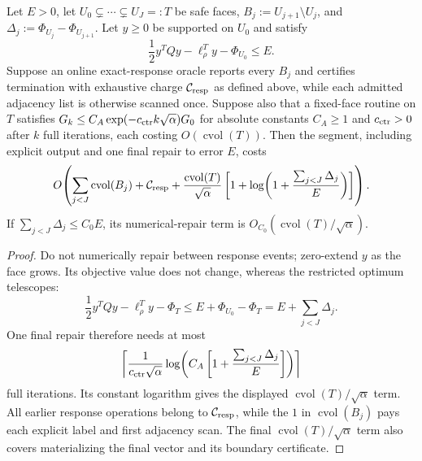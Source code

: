 \begin{theorem}
\label{thm:aggregate-repair-oracle}
Let $E>0$, let $U_0\subsetneq\cdots\subsetneq U_J=:T$ be safe faces,
$B_j:=U_{j+1}\setminus U_j$, and
$\Delta_j:=\Phi_{U_j}-\Phi_{U_{j+1}}$.  Let $y\geq0$ be supported on $U_0$
and satisfy
\begin{equation}
 \frac12y^TQy-\ell_\rho^Ty-\Phi_{U_0}\leq E.
 \label{eq:aggregate-initial-error}
\end{equation}
Suppose an online exact-response oracle reports every $B_j$ and certifies
termination with exhaustive charge $\mathcal C_{\rm resp}$ as defined above,
while each admitted adjacency list is otherwise scanned once.  Suppose also
that a fixed-face routine on $T$ satisfies
$G_k\leq C_A\exp(-c_{\rm ctr}k\sqrt\alpha)G_0$ for absolute constants
$C_A\geq1$ and $c_{\rm ctr}>0$ after $k$ full iterations, each costing
$O(\!\operatorname{cvol}(T))$.  Then the segment, including explicit output
and one final repair to error $E$, costs
\begin{equation}
 O\!\left(
  \sum_{j<J}\operatorname{cvol}(B_j)+\mathcal C_{\rm resp}
  +\frac{\operatorname{cvol}(T)}{\sqrt\alpha}\left[
    1+\log\!\left(1+\frac{\sum_{j<J}\Delta_j}{E}\right)
  \right]
 \right).
 \label{eq:aggregate-oracle-work}
\end{equation}
If $\sum_{j<J}\Delta_j\leq C_0E$, its numerical-repair term is
$O_{C_0}(\operatorname{cvol}(T)/\sqrt\alpha)$.
\end{theorem}

\begin{proof}
Do not numerically repair between response events; zero-extend $y$ as the face
grows.  Its objective value does not change, whereas the restricted optimum
telescopes:
\begin{equation}
 \frac12y^TQy-\ell_\rho^Ty-\Phi_T
 \leq E+\Phi_{U_0}-\Phi_T
 =E+\sum_{j<J}\Delta_j.
 \label{eq:aggregate-gap-telescope}
\end{equation}
One final repair therefore needs at most
\begin{equation}
 \left\lceil
  \frac1{c_{\rm ctr}\sqrt\alpha}
  \log\!\left(C_A\left[1+\frac{\sum_{j<J}\Delta_j}{E}\right]\right)
 \right\rceil
 \label{eq:aggregate-final-iterations}
\end{equation}
full iterations.  Its constant logarithm gives the displayed
$\operatorname{cvol}(T)/\sqrt\alpha$ term.  All earlier response operations
belong to $\mathcal C_{\rm resp}$, while the $1$ in
$\operatorname{cvol}(B_j)$ pays each explicit label and first adjacency
scan.  The final $\operatorname{cvol}(T)/\sqrt\alpha$ term also covers
materializing the final vector and its boundary certificate.
\end{proof}

